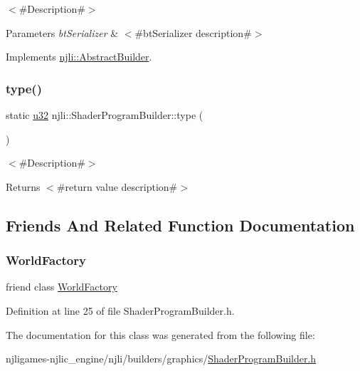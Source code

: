 $<$\#\+Description\#$>$


\begin{DoxyParams}{Parameters}
{\em bt\+Serializer} & $<$\#bt\+Serializer description\#$>$ \\
\hline
\end{DoxyParams}


Implements \mbox{\hyperlink{classnjli_1_1_abstract_builder_ab66b774e02ccb9da554c9aab7fa6d981}{njli\+::\+Abstract\+Builder}}.

\mbox{\label{classnjli_1_1_shader_program_builder_af7c6be5d68fae216af430dba56f249f9}} 
\subsubsection{\texorpdfstring{type()}{type()}}
{\footnotesize\ttfamily static \mbox{\hyperlink{_util_8h_a10e94b422ef0c20dcdec20d31a1f5049}{u32}} njli\+::\+Shader\+Program\+Builder\+::type (\begin{DoxyParamCaption}{ }\end{DoxyParamCaption})\hspace{0.3cm}{\ttfamily [static]}}

$<$\#\+Description\#$>$

\begin{DoxyReturn}{Returns}
$<$\#return value description\#$>$ 
\end{DoxyReturn}


\subsection{Friends And Related Function Documentation}
\mbox{\label{classnjli_1_1_shader_program_builder_acb96ebb09abe8f2a37a915a842babfac}} 
\subsubsection{\texorpdfstring{World\+Factory}{WorldFactory}}
{\footnotesize\ttfamily friend class \mbox{\hyperlink{classnjli_1_1_world_factory}{World\+Factory}}\hspace{0.3cm}{\ttfamily [friend]}}



Definition at line 25 of file Shader\+Program\+Builder.\+h.



The documentation for this class was generated from the following file\+:\begin{DoxyCompactItemize}
\item 
njligames-\/njlic\+\_\+engine/njli/builders/graphics/\mbox{\hyperlink{_shader_program_builder_8h}{Shader\+Program\+Builder.\+h}}\end{DoxyCompactItemize}
